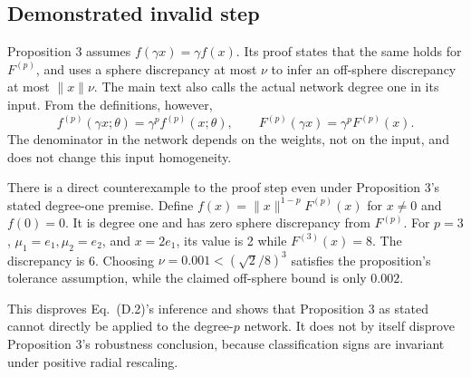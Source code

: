 \documentclass[10pt]{article}
\begin{document}
\subsection*{Demonstrated invalid step}
Proposition 3 assumes \(f(\gamma x)=\gamma f(x)\). Its proof states that the same holds for \(F^{(p)}\), and uses a sphere discrepancy at most \(\nu\) to infer an off-sphere discrepancy at most \(\|x\|\nu\). The main text also calls the actual network degree one in its input. From the definitions, however, \[f^{(p)}(\gamma x;\theta)=\gamma^p f^{(p)}(x;\theta),\qquad
 F^{(p)}(\gamma x)=\gamma^p F^{(p)}(x).\] The denominator in the network depends on the weights, not on the input, and does not change this input homogeneity.\par
There is a direct counterexample to the proof step even under Proposition 3’s stated degree-one premise. Define \(f(x)=\|x\|^{1-p}F^{(p)}(x)\) for \(x\ne0\) and \(f(0)=0\). It is degree one and has zero sphere discrepancy from \(F^{(p)}\). For \(p=3\), \(\mu_1=e_1,\mu_2=e_2\), and \(x=2e_1\), its value is 2 while \(F^{(3)}(x)=8\). The discrepancy is 6. Choosing \(\nu=0.001<(\sqrt2/8)^3\) satisfies the proposition’s tolerance assumption, while the claimed off-sphere bound is only \(0.002\).\par
This disproves Eq. (D.2)’s inference and shows that Proposition 3 as stated cannot directly be applied to the degree-\(p\) network. It does not by itself disprove Proposition 3’s robustness conclusion, because classification signs are invariant under positive radial rescaling.\par
\end{document}
